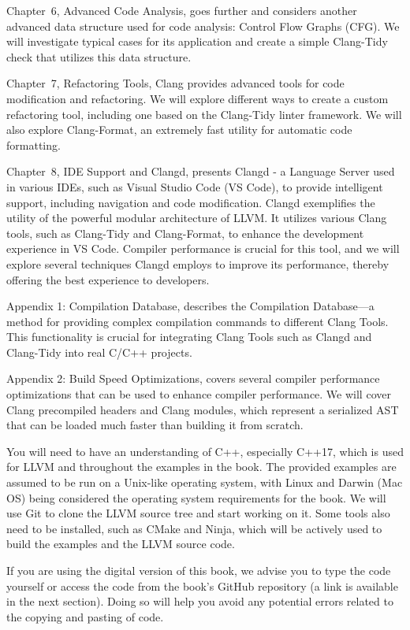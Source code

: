 Chapter 6, Advanced Code Analysis, goes further and considers another advanced data structure used for code analysis: Control Flow Graphs (CFG). We will investigate typical cases for its application and create a simple Clang-Tidy check that utilizes this data structure.

Chapter 7, Refactoring Tools, Clang provides advanced tools for code modification and refactoring. We will explore different ways to create a custom refactoring tool, including one based on the Clang-Tidy linter framework. We will also explore Clang-Format, an extremely fast utility for automatic code formatting.

Chapter 8, IDE Support and Clangd, presents Clangd - a Language Server used in various IDEs, such as Visual Studio Code (VS Code), to provide intelligent support, including navigation and code modification. Clangd exemplifies the utility of the powerful modular architecture of LLVM. It utilizes various Clang tools, such as Clang-Tidy and Clang-Format, to enhance the development experience in VS Code. Compiler performance is crucial for this tool, and we will explore several techniques Clangd employs to improve its performance, thereby offering the best experience to developers.

Appendix 1: Compilation Database, describes the Compilation Database—a method for providing complex compilation commands to different Clang Tools. This functionality is crucial for integrating Clang Tools such as Clangd and Clang-Tidy into real C/C++ projects.

Appendix 2: Build Speed Optimizations, covers several compiler performance optimizations that can be used to enhance compiler performance. We will cover Clang precompiled headers and Clang modules, which represent a serialized AST that can be loaded much faster than building it from scratch.



You will need to have an understanding of C++, especially C++17, which is used for LLVM and throughout the examples in the book. The provided examples are assumed to be run on a Unix-like operating system, with Linux and Darwin (Mac OS) being considered the operating system requirements for the book. We will use Git to clone the LLVM source tree and start working on it. Some tools also need to be installed, such as CMake and Ninja, which will be actively used to build the examples and the LLVM source code.

If you are using the digital version of this book, we advise you to type the code yourself or access the code from the book’s GitHub repository (a link is available in the next section). Doing so will help you avoid any potential errors related to the copying and pasting of code.

